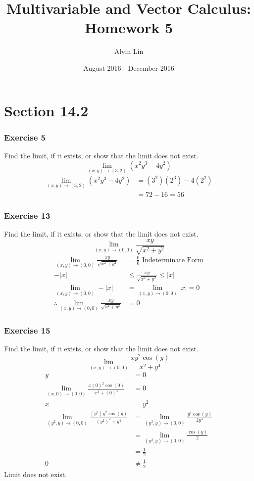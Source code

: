 \documentclass{math}
\title{Multivariable and Vector Calculus: Homework 5}
\author{Alvin Lin}
\date{August 2016 - December 2016}
\begin{document}
\maketitle

\section*{Section 14.2}

\subsubsection*{Exercise 5}
Find the limit, if it exists, or show that the limit does not exist.
\[ \lim_{(x,y)\to(3,2)}(x^2y^3-4y^2) \]
\begin{align*}
  \lim_{(x,y)\to(3,2)}(x^2y^3-4y^2) &= (3^2)(2^3)-4(2^2) \\
  &= 72-16 = 56
\end{align*}

\subsubsection*{Exercise 13}
Find the limit, if it exists, or show that the limit does not exist.
\[ \lim_{(x,y)\to(0,0)}\frac{xy}{\sqrt{x^2+y^2}} \]
\begin{align*}
  \lim_{(x,y)\to(0,0)}\frac{xy}{\sqrt{x^2+y^2}} &= \frac{0}{0}
    \text{ Indeterminate Form} \\
  -|x| &\le \frac{xy}{\sqrt{x^2+y^2}} \le |x| \\
  \lim_{(x,y)\to(0,0)}-|x| &= \lim_{(x,y)\to(0,0)}|x| = 0 \\
  \therefore \lim_{(x,y)\to(0,0)}\frac{xy}{\sqrt{x^2+y^2}} &= 0
\end{align*}

\subsubsection*{Exercise 15}
Find the limit, if it exists, or show that the limit does not exist.
\[ \lim_{(x,y)\to(0,0)}\frac{xy^2\cos(y)}{x^2+y^4} \]
\begin{align*}
  y &= 0 \\
  \lim_{(x,0)\to(0,0)}\frac{x(0)^2\cos(0)}{x^2+(0)^4} &= 0 \\
  x &= y^2 \\
  \lim_{(y^2,y)\to(0,0)}\frac{(y^2)y^2\cos(y)}{(y^2)^2+y^4} &=
    \lim_{(y^2,y)\to(0,0)}\frac{y^4\cos(y)}{2y^4} \\
  &= \lim_{(y^2,y)\to(0,0)}\frac{\cos(y)}{2} \\
  &= \frac{1}{2} \\
  0 &\ne \frac{1}{2}
\end{align*}
Limit does not exist.
\end{document}
